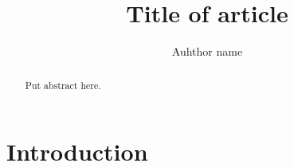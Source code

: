 \documentclass[TeXligs]{jlm}
\affiliation{Affiliation of author}
\author{Auhthor name}
\date{}
\title{Title of article}
\begin{document}
\maketitle
  \renewcommand{\chapterautorefname}{Chapter}%
  \renewcommand{\figureautorefname}{Figure}%
  \renewcommand{\tableautorefname}{Table}%
  \renewcommand{\sectionautorefname}{Section}%
  \renewcommand{\subsectionautorefname}{Section}%
  \renewcommand{\subsubsectionautorefname}{Section}%
  \renewcommand{\Hfootnoteautorefname}{Footnote}%

\begin{abstract}
Put abstract here.
\end{abstract}

\section{Introduction}
\label{sec:org06cee5a}



\end{document}
